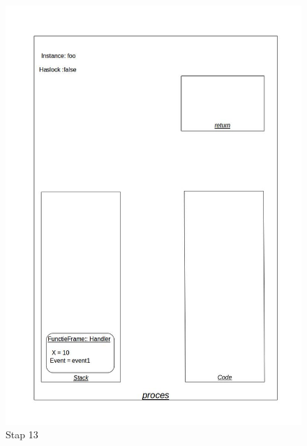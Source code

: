 \documentclass[]{article}
\begin{document}
\begin{figure}[H]
\centering
\includegraphics[scale=0.4]{AnalyseADTAlgorithm/processtappen/stap11.jpg}
\caption{Stap 13}
\end{figure}
\end{document}
